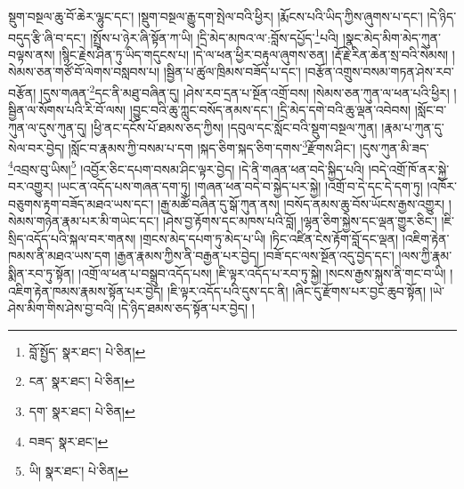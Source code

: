 སྡུག་བསྔལ་ཆུ་བོ་ཆེར་ལྷུང་དང་། །སྡུག་བསྔལ་རྒྱུ་དག་སྤེལ་བའི་ཕྱིར། །རྨོངས་པའི་ཡིད་ཀྱིས་ཞུགས་པ་དང་། །དེ་ཉིད་བདུད་རྩི་ཞི་བ་དང་། །སྤྲོས་པ་ཉེར་ཞི་སྟོན་ཀ་ཡི། །དྲི་མེད་མཁའ་ལ་:བློས་དཔྱོད་\footnote{བློ་སྤྱོད་  སྣར་ཐང་།  པེ་ཅིན། }པའི། །སྣང་མེད་མིག་མེད་ཀུན་བལྟས་ནས། །སྙིང་རྗེས་ཤིན་ཏུ་ཡིད་གདུངས་པ། །དེ་ལ་ཕན་ཕྱིར་བརྟུལ་ཞུགས་ཅན། །རྡོ་རྗེ་རིན་ཆེན་སྲ་བའི་སེམས། །སེམས་ཅན་གཙོ་བོ་ལེགས་བསླབས་པ། །སྦྱིན་པ་ཚུལ་ཁྲིམས་བཟོད་པ་དང་། །བརྩོན་འགྲུས་བསམ་གཏན་ཤེས་རབ་བརྩོན། །དུས་གཞན་\footnote{ངན་  སྣར་ཐང་།  པེ་ཅིན། }དང་ནི་མཐུ་བཞིན་དུ། །ཤེས་རབ་དྲན་པ་སྔོན་འགྲོ་བས། །སེམས་ཅན་ཀུན་ལ་ཕན་པའི་ཕྱིར། །སྦྱིན་ལ་སོགས་པའི་རི་བོ་ལས། །བྱུང་བའི་ཆུ་ཀླུང་བསོད་ནམས་དང་། །དྲི་མེད་དགེ་བའི་ཆུ་ལྡན་འབེབས། །སློང་བ་ཀུན་ལ་དུས་ཀུན་དུ། །ཕྱི་ནང་དངོས་པོ་ཐམས་ཅད་ཀྱིས། །དབུལ་དང་སློང་བའི་སྡུག་བསྔལ་ཀུན། །རྣམ་པ་ཀུན་དུ་སེལ་བར་བྱེད། །སློང་བ་རྣམས་ཀྱི་བསམ་པ་དག །སྐད་ཅིག་སྐད་ཅིག་དགས་\footnote{དག་  སྣར་ཐང་།  པེ་ཅིན། }རྫོགས་ཤིང་། །དུས་ཀུན་མི་ཟད་\footnote{བཟད་  སྣར་ཐང་། }འབྲས་བུ་ཡིས།\footnote{ཡི།  སྣར་ཐང་།  པེ་ཅིན། } །འབྱོར་ཅིང་དཔག་བསམ་ཤིང་ལྟར་བྱེད། །དེ་ནི་གཞན་ཕན་བདེ་སྐྱིད་པའི། །བདེ་འགྲོ་ཁོ་ནར་སྐྱེ་བར་འགྱུར། །ཡང་ན་འདོད་པས་གཞན་དག་ཏུ། །གཞན་ཕན་བདེ་བ་སྐྱེད་པར་སྐྱེ། །འགྲོ་བ་དེ་དང་དེ་དག་ཏུ། །འཁོར་བཅུགས་རྟག་བཟོད་མཐའ་ཡས་དང་། །རྒྱ་མཚོ་བཞིན་དུ་སྒོ་ཀུན་ནས། །བསོད་ནམས་ཆུ་བོས་ཡོངས་རྒྱས་འགྱུར། །སེམས་གཉེན་རྣམ་པར་མི་གཡེང་དང་། །ཤེས་བྱ་རྟོགས་དང་མཁས་པའི་བློ། །ལྷན་ཅིག་སྐྱེས་དང་ལྡན་གྱུར་ཅིང་། །ཇི་སྲིད་འདོད་པའི་སྐལ་བར་གནས། །གྲངས་མེད་དཔག་ཏུ་མེད་པ་ཡི། །ཏིང་འཛིན་ངེས་རྟོག་བློ་དང་ལྡན། །འཇིག་རྟེན་ཁམས་ནི་མཐའ་ཡས་དག །རྒྱན་རྣམས་ཀྱིས་ནི་བརྒྱན་པར་བྱེད། །བཟོ་དང་ལས་སྔོན་འདུ་བྱེད་དང་། །ལས་ཀྱི་རྣམ་སྨིན་རབ་ཏུ་སྟོན། །འགྲོ་ལ་ཕན་པ་བསྒྲུབ་འདོད་པས། །ཇི་ལྟར་འདོད་པ་རབ་ཏུ་སྐྱེ། །སངས་རྒྱས་སྐུས་ནི་གང་བ་ཡི། །འཇིག་རྟེན་ཁམས་རྣམས་སྟོན་པར་བྱེད། །ཇི་ལྟར་འདོད་པའི་དུས་དང་ནི། །ཞིང་དུ་རྫོགས་པར་བྱང་ཆུབ་སྟོན། །ཡེ་ཤེས་མིག་གིས་ཤེས་བྱ་བའི། །དེ་ཉིད་ཐམས་ཅད་སྟོན་པར་བྱེད། །
